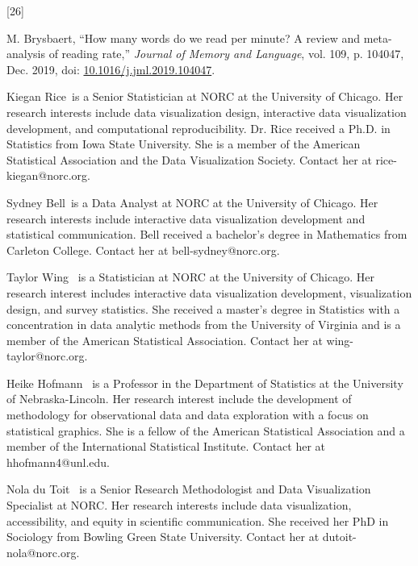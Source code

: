 \documentclass{IEEEcsmag}
\newlength{\cslhangindent}
\newlength{\csllabelwidth}
\newenvironment{CSLReferences}[2] %
 {\begin{list}{}{%
  \setlength{\itemindent}{0pt}
  \setlength{\leftmargin}{0pt}
  \setlength{\parsep}{0pt}
  \ifodd #1
   \setlength{\leftmargin}{\cslhangindent}
   \setlength{\itemindent}{-1\cslhangindent}
  \fi
  \setlength{\itemsep}{#2\baselineskip}}}
 {\end{list}}
\newcommand{\CSLLeftMargin}[1]{\parbox[t]{\csllabelwidth}{#1}}
\newcommand{\CSLRightInline}[1]{\parbox[t]{\linewidth - \csllabelwidth}{#1}\break}
\begin{document}
\begin{CSLReferences}{0}{0}
\CSLLeftMargin{{[}26{]} }%
\CSLRightInline{M. Brysbaert, {``How many words do we read per minute? {A} review and meta-analysis of reading rate,''} \emph{Journal of Memory and Language}, vol. 109, p. 104047, Dec. 2019, doi: \href{https://doi.org/10.1016/j.jml.2019.104047}{10.1016/j.jml.2019.104047}.}

\end{CSLReferences}


\begin{IEEEbiography}{Kiegan Rice}{\,} is a Senior Statistician at NORC at the University of Chicago. Her research interests include data visualization design, interactive data visualization development, and computational reproducibility. Dr. Rice received a Ph.D. in Statistics from Iowa State University. She is a member of the American Statistical Association and the Data Visualization Society. Contact her at rice-kiegan@norc.org.%
\end{IEEEbiography}

\begin{IEEEbiography}{Sydney Bell}{\,} is a Data Analyst at NORC at the University of Chicago.  Her research interests include interactive data visualization development and statistical communication. Bell received a bachelor's degree in Mathematics from Carleton College. Contact her  at bell-sydney@norc.org.\vspace*{8pt}
\end{IEEEbiography}

\begin{IEEEbiography}{Taylor Wing} {\,} is a Statistician at NORC at the University of Chicago. Her research interest includes interactive data visualization development, visualization design, and survey statistics. She received a master’s degree in Statistics with a concentration in data analytic methods from the University of Virginia and is a member of the American Statistical Association. Contact her at wing-taylor@norc.org.\vspace*{8pt}
\end{IEEEbiography}


\begin{IEEEbiography}{Heike Hofmann} {\,} is a Professor in the Department of Statistics at the University of Nebraska-Lincoln.  Her research interest include the development of methodology for observational data and data exploration with a focus on statistical graphics. She is a fellow of the American Statistical Association and a member of the International Statistical Institute. Contact her at hhofmann4@unl.edu.
\end{IEEEbiography}


\begin{IEEEbiography}{Nola du Toit} {\,} is a Senior Research Methodologist and Data Visualization Specialist at NORC. Her research interests include data visualization, accessibility, and equity in scientific communication. She received her PhD in Sociology from Bowling Green State University. Contact her at dutoit-nola@norc.org.
\end{IEEEbiography}
\end{document}
